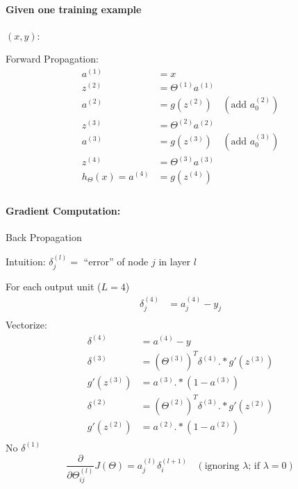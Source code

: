 \paragraph{Given one training example} $(x, y)$:

Forward Propagation:
\begin{align*}
	a^{(1)}               & = x                                            \\
	z^{(2)}               & = \Theta^{(1)}a^{(1)}                          \\
	a^{(2)}               & = g(z^{(2)})          & (\text{add }a_0^{(2)}) \\
	z^{(3)}               & = \Theta^{(2)}a^{(2)}                          \\
	a^{(3)}               & = g(z^{(3)})          & (\text{add }a_0^{(3)}) \\
	z^{(4)}               & = \Theta^{(3)}a^{(3)}                          \\
	h_\Theta(x) = a^{(4)} & = g(z^{(4)})                                   \\
\end{align*}

\paragraph{Gradient Computation:} Back Propagation

Intuition: $\delta_j^{(l)} = $ ``error'' of node $j$ in layer $l$

For each output unit ($L = 4$)
\begin{align*}
	\delta_j^{(4)} & = a_j^{(4)} - y_j \\
\end{align*}
Vectorize:
\begin{align*}
	\delta^{(4)} & = a^{(4)} - y                               \\
	\delta^{(3)} & = (\Theta^{(3)})^T\delta^{(4)}.*g'(z^{(3)}) \\
	g'(z^{(3)})  & = a^{(3)} .* (1 - a^{(3)})                  \\
	\delta^{(2)} & = (\Theta^{(2)})^T\delta^{(3)}.*g'(z^{(2)}) \\
	g'(z^{(2)})  & = a^{(2)} .* (1 - a^{(2)})                  \\
\end{align*}
No $\delta^{(1)}$
\begin{equation*}
	\frac{\partial}{\partial\Theta_{ij}^{(l)}} J(\Theta) =
	a_j^{(l)}\delta_i^{(l+1)}\ \ \ \ (\text{ignoring $\lambda$; if $\lambda = 0$})
\end{equation*}

